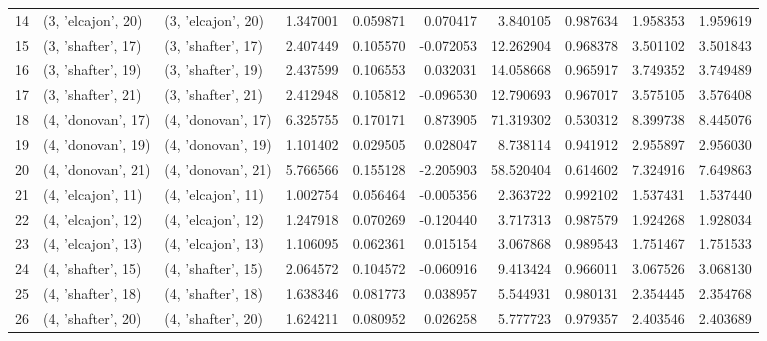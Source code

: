\begin{tabular}{lllrrrrrrr}
14 &  (3, 'elcajon', 20) &  (3, 'elcajon', 20) &  1.347001 &  0.059871 &  0.070417 &   3.840105 &  0.987634 &  1.958353 &  1.959619 \\
15 &  (3, 'shafter', 17) &  (3, 'shafter', 17) &  2.407449 &  0.105570 & -0.072053 &  12.262904 &  0.968378 &  3.501102 &  3.501843 \\
16 &  (3, 'shafter', 19) &  (3, 'shafter', 19) &  2.437599 &  0.106553 &  0.032031 &  14.058668 &  0.965917 &  3.749352 &  3.749489 \\
17 &  (3, 'shafter', 21) &  (3, 'shafter', 21) &  2.412948 &  0.105812 & -0.096530 &  12.790693 &  0.967017 &  3.575105 &  3.576408 \\
18 &  (4, 'donovan', 17) &  (4, 'donovan', 17) &  6.325755 &  0.170171 &  0.873905 &  71.319302 &  0.530312 &  8.399738 &  8.445076 \\
19 &  (4, 'donovan', 19) &  (4, 'donovan', 19) &  1.101402 &  0.029505 &  0.028047 &   8.738114 &  0.941912 &  2.955897 &  2.956030 \\
20 &  (4, 'donovan', 21) &  (4, 'donovan', 21) &  5.766566 &  0.155128 & -2.205903 &  58.520404 &  0.614602 &  7.324916 &  7.649863 \\
21 &  (4, 'elcajon', 11) &  (4, 'elcajon', 11) &  1.002754 &  0.056464 & -0.005356 &   2.363722 &  0.992102 &  1.537431 &  1.537440 \\
22 &  (4, 'elcajon', 12) &  (4, 'elcajon', 12) &  1.247918 &  0.070269 & -0.120440 &   3.717313 &  0.987579 &  1.924268 &  1.928034 \\
23 &  (4, 'elcajon', 13) &  (4, 'elcajon', 13) &  1.106095 &  0.062361 &  0.015154 &   3.067868 &  0.989543 &  1.751467 &  1.751533 \\
24 &  (4, 'shafter', 15) &  (4, 'shafter', 15) &  2.064572 &  0.104572 & -0.060916 &   9.413424 &  0.966011 &  3.067526 &  3.068130 \\
25 &  (4, 'shafter', 18) &  (4, 'shafter', 18) &  1.638346 &  0.081773 &  0.038957 &   5.544931 &  0.980131 &  2.354445 &  2.354768 \\
26 &  (4, 'shafter', 20) &  (4, 'shafter', 20) &  1.624211 &  0.080952 &  0.026258 &   5.777723 &  0.979357 &  2.403546 &  2.403689 \\
\bottomrule
\end{tabular}
